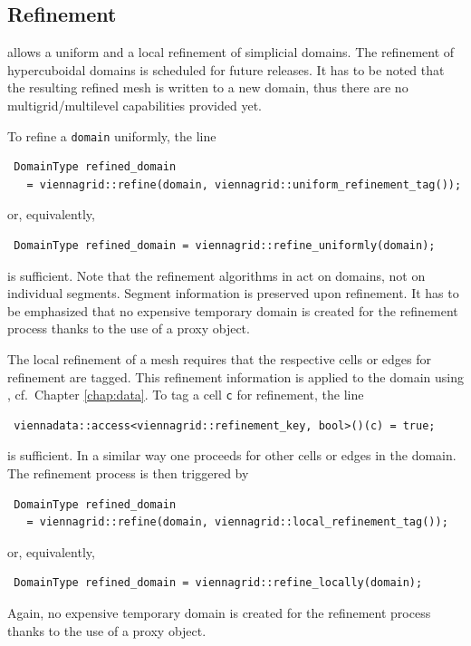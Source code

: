 

 \subsection{Refinement}
 {\ViennaGridversion} allows a uniform and a local refinement of simplicial domains. The refinement of hypercuboidal domains is scheduled for future releases.
It has to be noted that the resulting refined mesh is written to a new domain, thus there are no multigrid/multilevel capabilities provided yet.

 To refine a \lstinline|domain| uniformly, the line
 \begin{lstlisting}
 DomainType refined_domain
   = viennagrid::refine(domain, viennagrid::uniform_refinement_tag());
 \end{lstlisting}
 or, equivalently,
 \begin{lstlisting}
 DomainType refined_domain = viennagrid::refine_uniformly(domain);
 \end{lstlisting}
 is sufficient. Note that the refinement algorithms in {\ViennaGrid} act on domains, not on individual segments. Segment information is preserved upon refinement.
 It has to be emphasized that no expensive temporary domain is created for the refinement process thanks to the use of a proxy object.

 The local refinement of a mesh requires that the respective cells or edges for refinement are tagged. This refinement information is applied to the domain using {\ViennaData}, cf.~Chapter \ref{chap:data}.
 To tag a cell \lstinline|c| for refinement, the line
 \begin{lstlisting}
 viennadata::access<viennagrid::refinement_key, bool>()(c) = true;
 \end{lstlisting}
 is sufficient. In a similar way one proceeds for other cells or edges in the domain. The refinement process is then triggered by
 \begin{lstlisting}
 DomainType refined_domain 
   = viennagrid::refine(domain, viennagrid::local_refinement_tag());
 \end{lstlisting}
 or, equivalently,
 \begin{lstlisting}
 DomainType refined_domain = viennagrid::refine_locally(domain);
 \end{lstlisting}
 Again, no expensive temporary domain is created for the refinement process thanks to the use of a proxy object.

